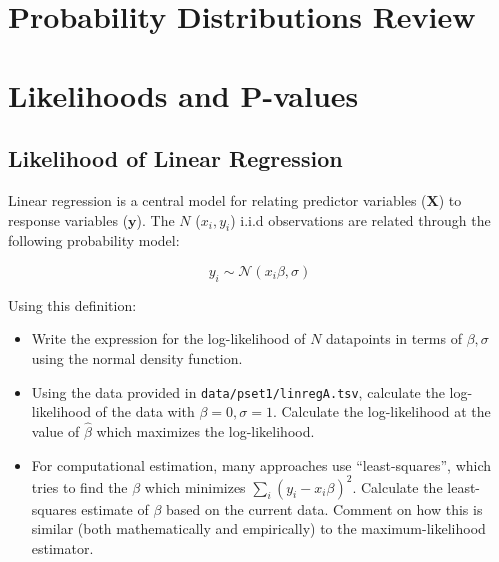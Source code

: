 \documentclass{pset}
\date{6/1/2025}
\begin{document}
\maketitle

\section*{Probability Distributions Review}

\subsection*{}


\subsection*{}


\section*{Likelihoods and P-values}

\subsection*{Likelihood of Linear Regression}

Linear regression is a central model for relating predictor variables ($\mathbf{X}$) to response variables ($\mathbf{y}$). The $N$ ($x_i, y_i$) i.i.d observations are related through the following probability model: 

$$y_i \sim \mathcal{N}(x_i\beta, \sigma)$$ 

Using this definition:

\begin{itemize}
\item Write the expression for the log-likelihood of $N$ datapoints in terms of $\beta,\sigma$ using the normal density function.
\item Using the data provided in \texttt{data/pset1/linregA.tsv}, calculate the log-likelihood of the data with $\beta = 0,\sigma=1$. Calculate the log-likelihood at the value of $\hat{\beta}$ which maximizes the log-likelihood. 
\item For computational estimation, many approaches use ``least-squares'', which tries to find the $\beta$ which minimizes $\sum_i (y_i - x_i\beta)^2$. Calculate the least-squares estimate of $\beta$ based on the current data. Comment on how this is similar (both mathematically and empirically) to the maximum-likelihood estimator.
\end{itemize}
\end{document}
